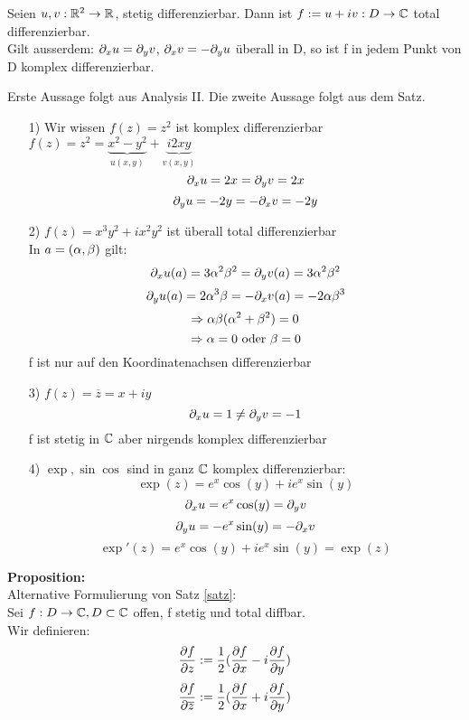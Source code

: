 \begin{satz}\label{satz}
	Seien $u,v:\mathbb{R}^2 \to \mathbb{R}$, stetig differenzierbar. Dann ist $f:=u+iv: D \to \mathbb{C}$ total 
	differenzierbar.\\
	Gilt ausserdem: $ \partial_x u= \partial_y v$, $\partial_x v = -\partial_y u$ überall in D, so ist 
	f in jedem Punkt von D komplex differenzierbar.
\end{satz}
\begin{bemerkung}
	Erste Aussage folgt aus Analysis II. Die zweite Aussage folgt aus dem Satz.
\end{bemerkung}
\begin{beispiel}
	\begin{itemize}
		\item[1)] Wir wissen $f(z) = z^2$ ist komplex differenzierbar
		$f(z) = z^2 = \underbrace{x^2 - y^2}_{u(x,y)}  + \underbrace{i 2xy}_{v(x,y)}$\\
		\[\partial_x u = 2x = \partial_yv = 2x\]
		\[\partial_y u = -2y = -\partial_xv = -2y\]
		\item[2)] $f(z)=x^3y^2+ix^2y^2$ ist überall total differenzierbar\\
		In $a = (\alpha,\beta)$ gilt:
		\[ \partial_xu(a) = 3\alpha^2\beta^2 = \partial_yv(a)=3\alpha^2\beta^2 \]
		\[ \partial_yu(a) = 2\alpha^3\beta = -\partial_xv(a)= -2\alpha\beta^3 \]
		\[\Rightarrow \alpha\beta(\alpha^2+\beta^2)=0\]
		\[\Rightarrow \alpha=0 \text{ oder } \beta = 0\]
		f ist nur auf den Koordinatenachsen differenzierbar
		\item[3)]
		$f(z) = \overline{z} = x +iy$
		\[\partial_xu= 1 \ne \partial_yv = -1\]
		f ist stetig in $\mathbb{C}$ aber nirgends komplex differenzierbar
		\item[4)]
		$\exp,\sin\cos$ sind in ganz $\mathbb{C}$ komplex differenzierbar: 
		\[\exp(z) = e^x\cos(y)+i e^x \sin(y)\]
		\[\partial_xu = e^x\cos(y)= \partial_y v\]
		\[\partial_yu = -e^x\sin(y)= -\partial_x v\]
		\[\exp\prime(z) =e^x \cos(y)+ie^x\sin(y)= \exp(z)\]
		
	\end{itemize}
\end{beispiel}

\textbf{Proposition:}\\
Alternative Formulierung von Satz \ref{satz}:\\
Sei $ f:D\to \mathbb{C}, D \subset \mathbb{C}$ offen, f stetig und total diffbar.\\
Wir definieren:
\[
\frac{\partial f}{\partial z}:= \frac{1}{2} (\frac{\partial f}{\partial x}-i\frac{\partial f}{\partial y}) 
\]
\[
\frac{\partial f}{\partial \overline{z}}:= \frac{1}{2} (\frac{\partial f}{\partial x}+i\frac{\partial f}{\partial y})
\]

